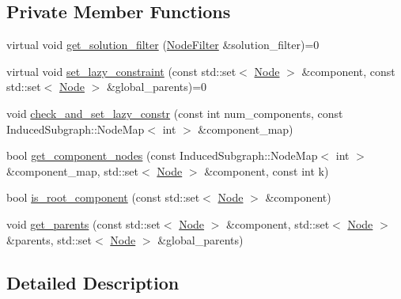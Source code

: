 \subsection*{Private Member Functions}
\begin{DoxyCompactItemize}
\item 
virtual void \hyperlink{classderegnet_1_1LazyConstraintCallback_aebc9854e98523c99d3f856ff71bb86fb}{get\+\_\+solution\+\_\+filter} (\hyperlink{namespacederegnet_a50db1f8fc7c6a954d825d9e1ed9ad302}{Node\+Filter} \&solution\+\_\+filter)=0
\item 
virtual void \hyperlink{classderegnet_1_1LazyConstraintCallback_a8f6db7da84271afcd2e2169318569558}{set\+\_\+lazy\+\_\+constraint} (const std\+::set$<$ \hyperlink{namespacederegnet_a744bad34f2de9856d36715a445f027f3}{Node} $>$ \&component, const std\+::set$<$ \hyperlink{namespacederegnet_a744bad34f2de9856d36715a445f027f3}{Node} $>$ \&global\+\_\+parents)=0
\item 
void \hyperlink{classderegnet_1_1LazyConstraintCallback_a02eb39d4ea843597aa7c3382f17af874}{check\+\_\+and\+\_\+set\+\_\+lazy\+\_\+constr} (const int num\+\_\+components, const Induced\+Subgraph\+::\+Node\+Map$<$ int $>$ \&component\+\_\+map)
\item 
bool \hyperlink{classderegnet_1_1LazyConstraintCallback_a9ebed5d496c64603628b8655dd538839}{get\+\_\+component\+\_\+nodes} (const Induced\+Subgraph\+::\+Node\+Map$<$ int $>$ \&component\+\_\+map, std\+::set$<$ \hyperlink{namespacederegnet_a744bad34f2de9856d36715a445f027f3}{Node} $>$ \&component, const int k)
\item 
bool \hyperlink{classderegnet_1_1LazyConstraintCallback_a3eb6c682c8e1129036f1218513d6feb0}{is\+\_\+root\+\_\+component} (const std\+::set$<$ \hyperlink{namespacederegnet_a744bad34f2de9856d36715a445f027f3}{Node} $>$ \&component)
\item 
void \hyperlink{classderegnet_1_1LazyConstraintCallback_ab1357c9415e190aaa56ed87022ec0b82}{get\+\_\+parents} (const std\+::set$<$ \hyperlink{namespacederegnet_a744bad34f2de9856d36715a445f027f3}{Node} $>$ \&component, std\+::set$<$ \hyperlink{namespacederegnet_a744bad34f2de9856d36715a445f027f3}{Node} $>$ \&parents, std\+::set$<$ \hyperlink{namespacederegnet_a744bad34f2de9856d36715a445f027f3}{Node} $>$ \&global\+\_\+parents)
\end{DoxyCompactItemize}


\subsection{Detailed Description}


